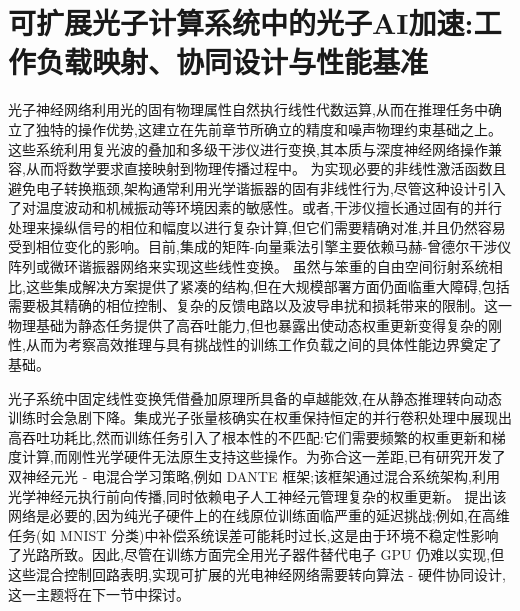 \section{可扩展光子计算系统中的光子AI加速:工作负载映射、协同设计与性能基准}\label{ux53efux6269ux5c55ux5149ux5b50ux8ba1ux7b97ux7cfbux7edfux4e2dux7684ux5149ux5b50aiux52a0ux901fux5de5ux4f5cux8d1fux8f7dux6620ux5c04ux534fux540cux8bbeux8ba1ux4e0eux6027ux80fdux57faux51c6}

光子神经网络利用光的固有物理属性自然执行线性代数运算,从而在推理任务中确立了独特的操作优势,这建立在先前章节所确立的精度和噪声物理约束基础之上。这些系统利用复光波的叠加和多级干涉仪进行变换,其本质与深度神经网络操作兼容,从而将数学要求直接映射到物理传播过程中。\citep{doi_10_1007_s11075_025_02218_2_e396aae0} \citep{doi_10_48550_arxiv_2510_03186_c4d4955e} 为实现必要的非线性激活函数且避免电子转换瓶颈,架构通常利用光学谐振器的固有非线性行为,尽管这种设计引入了对温度波动和机械振动等环境因素的敏感性。或者,干涉仪擅长通过固有的并行处理来操纵信号的相位和幅度以进行复杂计算,但它们需要精确对准,并且仍然容易受到相位变化的影响。目前,集成的矩阵-向量乘法引擎主要依赖马赫-曾德尔干涉仪阵列或微环谐振器网络来实现这些线性变换。\citep{doi_10_1117_12_2690776_82e594d2} \citep{doi_10_54254_2753_8818_2026_33628_f99a21e9} 虽然与笨重的自由空间衍射系统相比,这些集成解决方案提供了紧凑的结构,但在大规模部署方面仍面临重大障碍,包括需要极其精确的相位控制、复杂的反馈电路以及波导串扰和损耗带来的限制。这一物理基础为静态任务提供了高吞吐能力,但也暴露出使动态权重更新变得复杂的刚性,从而为考察高效推理与具有挑战性的训练工作负载之间的具体性能边界奠定了基础。\citep{doi_10_3390_nano14080697_c372a140} \citep{s2_b765388f3cc18d6e5a0507522822def0e3503ec6_fa09b483} \citep{doi_10_1088_1402_4896_ae8345_3b948559}

光子系统中固定线性变换凭借叠加原理所具备的卓越能效,在从静态推理转向动态训练时会急剧下降。集成光子张量核确实在权重保持恒定的并行卷积处理中展现出高吞吐功耗比,然而训练任务引入了根本性的不匹配:它们需要频繁的权重更新和梯度计算,而刚性光学硬件无法原生支持这些操作。为弥合这一差距,已有研究开发了双神经元光 - 电混合学习策略,例如 DANTE 框架;该框架通过混合系统架构,利用光学神经元执行前向传播,同时依赖电子人工神经元管理复杂的权重更新。\citep{doi_10_1038_s41467_023_42984_y_7fc109e3} 提出该网络是必要的,因为纯光子硬件上的在线原位训练面临严重的延迟挑战;例如,在高维任务(如 MNIST 分类)中补偿系统误差可能耗时过长,这是由于环境不稳定性影响了光路所致。因此,尽管在训练方面完全用光子器件替代电子 GPU 仍难以实现,但这些混合控制回路表明,实现可扩展的光电神经网络需要转向算法 - 硬件协同设计,这一主题将在下一节中探讨。\citep{doi_10_1515_nanoph_2022_0423_38a2c3ec} \citep{doi_10_1038_s41467_023_42984_y_7fc109e3} \citep{doi_10_1038_s41467_022_35772_7_90150ade}

